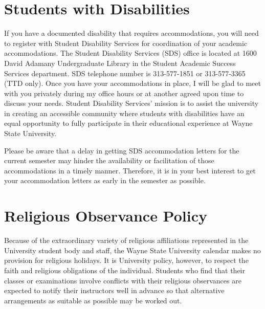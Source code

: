 \section*{Students with Disabilities}
If you have a documented disability that requires accommodations, you will need to register with Student Disability Services for coordination of your academic accommodations. 
The Student Disability Services (SDS) office is located at 1600 David Adamany Undergraduate Library in the Student Academic Success Services department. 
SDS telephone number is 313-577-1851 or 313-577-3365 (TTD only). 
Once you have your accommodations in place, I will be glad to meet with you privately during my office hours or at another agreed upon time to discuss your needs. 
Student Disability Services' mission is to assist the university in creating an accessible community where students with disabilities have an equal opportunity to fully participate in their educational experience at Wayne State University.
\par
Please be aware that a delay in getting SDS accommodation letters for the current semester may hinder the availability or facilitation of those accommodations in a timely manner.
Therefore, it is in your best interest to get your accommodation letters as early in the semester as possible.

\section*{Religious Observance Policy}
Because of the extraordinary variety of religious affiliations represented in the University student body and staff, the Wayne State University calendar makes no provision for religious holidays.
It is University policy, however, to respect the faith and religious obligations of the individual.
Students who find that their classes or examinations involve conflicts with their religious observances are expected to notify their instructors well in advance so that alternative arrangements as suitable as possible may be worked out.

